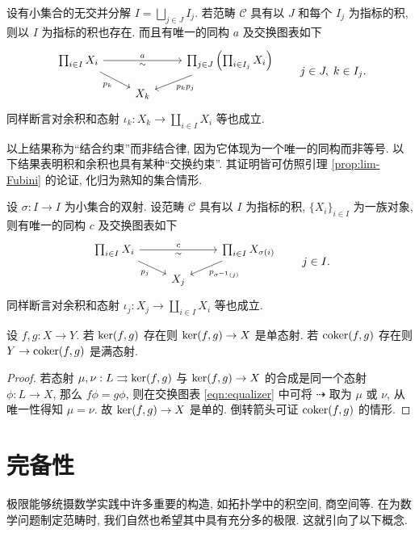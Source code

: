 \begin{lemma}[积和余积的结合约束]\label{prop:product-associativity}
	设有小集合的无交并分解 $I = \bigsqcup_{j \in J}  I_j$. 若范畴 $\mathcal{C}$ 具有以 $J$ 和每个 $I_j$ 为指标的积, 则以 $I$ 为指标的积也存在. 而且有唯一的同构 $a$ 及交换图表如下
	\[\begin{tikzcd}[row sep=small]
		 \prod_{i \in I} X_i \arrow[rr, "a", "\sim"'] \arrow[rd, "p_k"'] & & \prod_{j \in J} \left( \prod_{i \in I_j} X_i \right) \arrow[ld, "p_k p_j"] \\
		 & X_k & 
	\end{tikzcd} \qquad j \in J, \; k \in I_j. \]
	同样断言对余积和态射 $\iota_k: X_k \to \coprod_{i \in I} X_i$ 等也成立.
\end{lemma}
以上结果称为``结合约束''而非结合律, 因为它体现为一个唯一的同构而非等号. 以下结果表明积和余积也具有某种``交换约束''. 其证明皆可仿照引理 \ref{prop:lim-Fubini} 的论证, 化归为熟知的集合情形.
\begin{lemma}[积和余积的交换约束]\label{prop:product-commutativity}
	设 $\sigma: I \to I$ 为小集合的双射. 设范畴 $\mathcal{C}$ 具有以 $I$ 为指标的积, $\{X_i\}_{i \in I}$ 为一族对象, 则有唯一的同构 $c$ 及交换图表如下
	\[\begin{tikzcd}[row sep=small]
		\prod_{i \in I} X_i \arrow[rr, "c", "\sim"'] \arrow[rd, "p_j"'] & & \prod_{i \in I} X_{\sigma(i)} \arrow[ld, "p_{\sigma^{-1}(j)}"] \\
		& X_j &
	\end{tikzcd} \qquad j \in I. \]
	同样断言对余积和态射 $\iota_j: X_j \to \coprod_{i \in I} X_i$ 等也成立.
\end{lemma}

\begin{lemma}
	设 $f,g: X \to Y$. 若 $\operatorname{ker}(f,g)$ 存在则 $\operatorname{ker}(f,g) \to X$ 是单态射. 若 $\operatorname{coker}(f,g)$ 存在则 $Y \to \operatorname{coker}(f,g)$ 是满态射.
\end{lemma}
\begin{proof}
	若态射 $\mu, \nu: L \rightrightarrows \operatorname{ker}(f,g)$ 与 $\operatorname{ker}(f,g) \to X$ 的合成是同一个态射 $\phi: L \to X$, 那么 $f\phi = g\phi$, 则在交换图表 \eqref{eqn:equalizer} 中可将 $\dasharrow$ 取为 $\mu$ 或 $\nu$, 从唯一性得知 $\mu=\nu$. 故 $\operatorname{ker}(f,g) \to X$ 是单的. 倒转箭头可证 $\operatorname{coker}(f,g)$ 的情形.
\end{proof}

\section{完备性}
极限能够统摄数学实践中许多重要的构造, 如拓扑学中的积空间, 商空间等. 在为数学问题制定范畴时, 我们自然也希望其中具有充分多的极限. 这就引向了以下概念.

